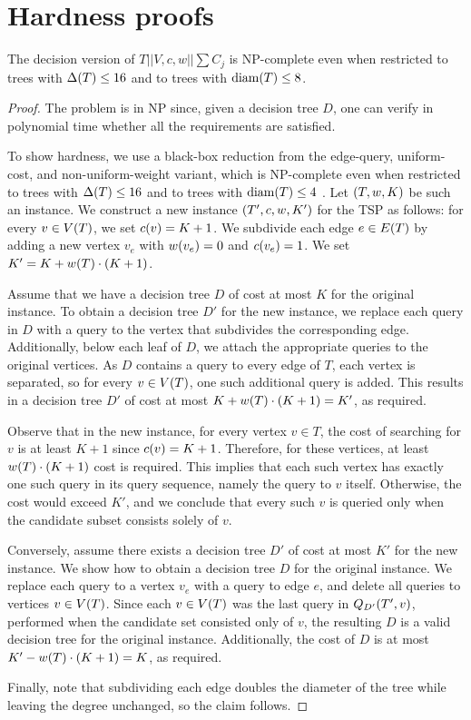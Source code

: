 \chapter{Hardness proofs}
\begin{theorem}
    The decision version of $T||V,c,w||\sum C_j$ is NP-complete even when restricted to trees with $\Delta\mathopen{}\left( T \right)\leq 16$ and to trees with $\operatorname{diam}\mathopen{}\left( T \right)\leq 8$.
    \begin{proof}
        The problem is in NP since, given a decision tree $D$, one can verify in polynomial time 
whether all the requirements are satisfied.

To show hardness, we use a black-box reduction from the edge-query, uniform-cost, 
and non-uniform-weight variant, which is NP-complete even when restricted to trees with $\Delta\mathopen{}\left( T \right)\leq 16$ and to trees with $\operatorname{diam}\mathopen{}\left( T \right)\leq 4$ \cite{Jacobs2010OnTheComplexSearchInTsAvg}. 
Let $\mathopen{}\left( T, w, K \right)$ be such an instance. 
We construct a new instance $\mathopen{}\left( T', c, w, K' \right)$ for the TSP as follows: 
for every $v \in V\mathopen{}\left( T \right)$, we set $c\mathopen{}\left( v \right) = K+1$. 
We subdivide each edge $e \in E\mathopen{}\left( T \right)$ by adding a new vertex $v_e$ with 
$w\mathopen{}\left( v_e \right) = 0$ and $c\mathopen{}\left( v_e \right) = 1$. 
We set $K' = K + w\mathopen{}\left( T \right) \cdot \mathopen{}\left( K+1 \right)$.

Assume that we have a decision tree $D$ of cost at most $K$ for the original instance. 
To obtain a decision tree $D'$ for the new instance, we replace each query in $D$ 
with a query to the vertex that subdivides the corresponding edge. 
Additionally, below each leaf of $D$, we attach the appropriate queries to the original vertices. 
As $D$ contains a query to every edge of $T$, each vertex is separated, so for every 
$v \in V\mathopen{}\left( T \right)$, one such additional query is added. 
This results in a decision tree $D'$ of cost at most $K + w\mathopen{}\left( T \right) \cdot \mathopen{}\left( K+1 \right)= K'$, 
as required.

Observe that in the new instance, for every vertex $v \in T$, the cost of searching for $v$ 
is at least $K+1$ since $c\mathopen{}\left( v \right) = K+1$. 
Therefore, for these vertices, at least $w\mathopen{}\left( T \right) \cdot \mathopen{}\left( K+1 \right)$ cost is required. 
This implies that each such vertex has exactly one such query in its query sequence, 
namely the query to $v$ itself. Otherwise, the cost would exceed $K'$, and we conclude 
that every such $v$ is queried only when the candidate subset consists solely of $v$. 

Conversely, assume there exists a decision tree $D'$ of cost at most $K'$ for the new instance. 
We show how to obtain a decision tree $D$ for the original instance. 
We replace each query to a vertex $v_e$ with a query to edge $e$, 
and delete all queries to vertices $v \in V\mathopen{}\left( T \right)$. 
Since each $v \in V\mathopen{}\left( T \right)$ was the last query in $Q_{D'}\mathopen{}\left( T', v \right)$, performed 
when the candidate set consisted only of $v$, the resulting $D$ is a valid decision tree 
for the original instance. Additionally, the cost of $D$ is at most $K' - w\mathopen{}\left( T \right) \cdot \mathopen{}\left( K+1 \right) = K$, 
as required.

Finally, note that subdividing each edge doubles the diameter of the tree while leaving the degree unchanged, 
so the claim follows.

    \end{proof}
\end{theorem}
